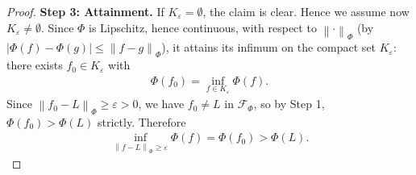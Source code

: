 \documentclass{amsart}
\theoremstyle{definition}
\newcommand{\norm}[1]{\left\|#1\right\|}
\newcommand{\F}{\mathcal{F}}
\begin{document}
\begin{proof}
    \textbf{Step 3: Attainment.}
    If $K_\varepsilon =\emptyset$, the claim is clear. Hence we assume now $K_\varepsilon \neq \emptyset$.
    Since $\Phi$ is Lipschitz, hence continuous, with respect to $\norm{\cdot}_\Phi$ (by $|\Phi(f) - \Phi(g)| \le \norm{f-g}_\Phi$), it attains its infimum on the compact set $K_\varepsilon$: there exists $f_0 \in K_\varepsilon$ with
    \begin{eqnarray*}
        \Phi(f_0) = \inf_{f \in K_\varepsilon} \Phi(f).
    \end{eqnarray*}
    Since $\norm{f_0 - L}_\Phi \ge \varepsilon > 0$, we have $f_0 \neq L$ in $\F_\Phi$, so by Step 1, $\Phi(f_0) > \Phi(L)$ strictly. Therefore
    \begin{eqnarray*}
        \inf\limits_{\norm{f-L}_\Phi \ge \varepsilon} \Phi(f) = \Phi(f_0) > \Phi(L).
    \end{eqnarray*}
\end{proof}
\end{document}
